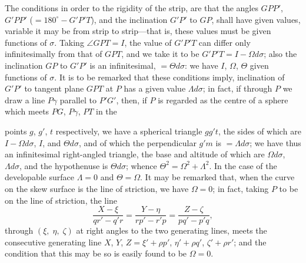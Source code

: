 \documentclass[11pt,a4paper,english]{article}
\theoremstyle{plain}
\begin{document}
The conditions in order to the rigidity of the strip, are that the angles $GPP'$, $G'PP'$ ($= 180^{\circ} - G'P'T$), and the inclination $G'P'$ to $GP$, shall have given values, variable it may be from strip to strip---that is, these values must be given functions of $\sigma$. Taking $\angle GPT = I$, the value of $G'P'T$ can differ only infinitesimally from that of $GPT$, and we take it to be $G'P'T = I - \Omega d\sigma$; also the inclination $GP$ to $G'P'$ is an infinitesimal, $= \Theta d\sigma$: we have $I$, $\Omega$, $\Theta$ given functions of $\sigma$. It is to be remarked that these conditions imply, inclination of $G'P'$ to tangent plane $GPT$ at $P$ has a given value $\Lambda d\sigma$; in fact, if through $P$ we draw a line $P\gamma$ parallel to $P'G'$, then, if $P$ is regarded as the centre of a sphere which meets $PG$, $P\gamma$, $PT$ in the

\newpage
\noindent points $g$, $g'$, $t$ respectively, we have a spherical triangle $gg't$, the sides of which are $I - \Omega d\sigma$, $I$, and $\Theta d\sigma$, and of which the perpendicular $g'm$ is $= \Lambda d\sigma$; we have thus an infinitesimal right-angled triangle, the base and altitude of which are $\Omega d\sigma$, $\Lambda d\sigma$, and the hypothenuse is $\Theta d\sigma$; whence $\Theta^2 = \Omega^2 + \Lambda^2$. In the case of the developable surface $\Lambda = 0$ and $\Theta = \Omega$. It may be remarked that, when the curve on the skew surface is the line of striction, we have $\Omega = 0$; in fact, taking $P$ to be on the line of striction, the line
\[
\frac{X - \xi}{qr' - q'r} = \frac{Y - \eta}{rp' - r'p} = \frac{Z - \zeta}{pq' - p'q},
\]
through $(\xi,\; \eta,\; \zeta)$ at right angles to the two generating lines, meets the consecutive generating line $X$, $Y$, $Z = \xi' + \rho p'$, $\eta' + \rho q'$, $\zeta' + \rho r'$; and the condition that this may be so is easily found to be $\Omega = 0$.
\end{document}

